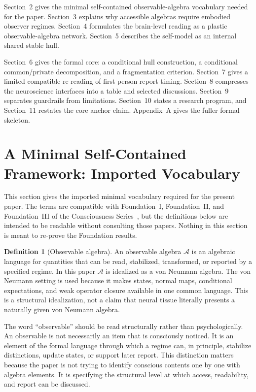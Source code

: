 \documentclass[12pt]{article}
\theoremstyle{definition}
\newtheorem{definition}[proposition]{Definition}
\theoremstyle{remark}
\begin{document}
Section~2 gives the minimal self-contained observable-algebra
vocabulary needed for the paper. Section~3 explains why accessible
algebras require embodied observer regimes. Section~4 formulates the
brain-level reading as a plastic observable-algebra network. Section~5
describes the self-model as an internal shared stable hull.

Section~6 gives the formal core: a conditional hull construction, a
conditional common/private decomposition, and a fragmentation criterion.
Section~7 gives a limited compatible re-reading of first-person report
timing. Section~8 compresses the neuroscience interfaces into a table
and selected discussions. Section~9 separates guardrails from
limitations. Section~10 states a research program, and Section~11
restates the core anchor claim. Appendix~A gives the fuller formal
skeleton.

\section{A Minimal Self-Contained Framework: Imported Vocabulary}

This section gives the imported minimal vocabulary required for the
present paper. The terms are compatible with Foundation~I, Foundation~II, and
Foundation~III of the Consciousness Series~\cite{FoundationI,FoundationII,FoundationIII},
but the definitions below are intended to be readable without consulting
those papers. Nothing in this section is meant to re-prove the
Foundation results.

\begin{definition}[Observable algebra]
An observable algebra \(\mathcal A\) is an algebraic language for
quantities that can be read, stabilized, transformed, or reported by a
specified regime. In this paper \(\mathcal A\) is idealized as a von
Neumann algebra. The von Neumann setting is used because it makes states,
normal maps, conditional expectations, and weak operator closure
available in one common language. This is a structural idealization, not
a claim that neural tissue literally presents a naturally given von
Neumann algebra.
\end{definition}

The word ``observable'' should be read structurally rather than
psychologically. An observable is not necessarily an item that is
consciously noticed. It is an element of the formal language through
which a regime can, in principle, stabilize distinctions, update states,
or support later report. This distinction matters because the paper is
not trying to identify conscious contents one by one with algebra
elements. It is specifying the structural level at which access,
readability, and report can be discussed.
\end{document}

